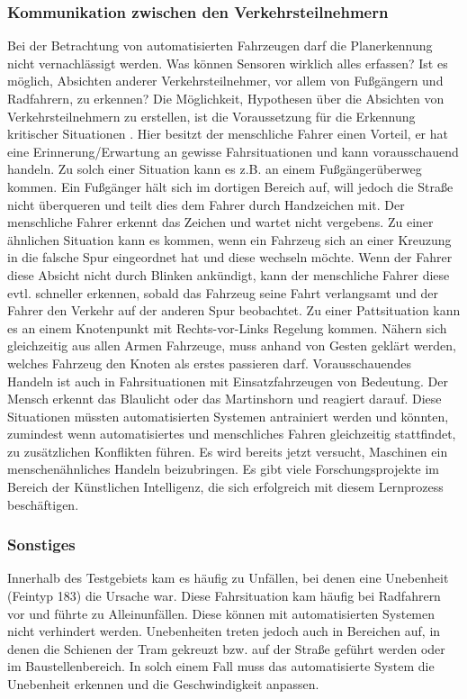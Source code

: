 \subsubsection{Kommunikation zwischen den Verkehrsteilnehmern}
Bei der Betrachtung von automatisierten Fahrzeugen darf die Planerkennung nicht vernachlässigt werden. Was können Sensoren wirklich alles erfassen? Ist es möglich, Absichten anderer Verkehrsteilnehmer, vor allem von Fußgängern und Radfahrern, zu erkennen? Die Möglichkeit, Hypothesen über die Absichten von Verkehrsteilnehmern zu erstellen, ist die Voraussetzung für die Erkennung kritischer Situationen \parencite[S. 30]{MockHecker.1994}. Hier besitzt der menschliche Fahrer einen Vorteil, er hat eine Erinnerung/Erwartung an gewisse Fahrsituationen und kann vorausschauend handeln. Zu solch einer Situation kann es z.B. an einem Fußgängerüberweg kommen. Ein Fußgänger hält sich im dortigen Bereich auf, will jedoch die Straße nicht überqueren und teilt dies dem Fahrer durch Handzeichen mit. Der menschliche Fahrer erkennt das Zeichen und wartet nicht vergebens. Zu einer ähnlichen Situation kann es kommen, wenn ein Fahrzeug sich an einer Kreuzung in die falsche Spur eingeordnet hat und diese wechseln möchte. Wenn der Fahrer diese Absicht nicht durch Blinken ankündigt, kann der menschliche Fahrer diese evtl. schneller erkennen, sobald das Fahrzeug seine Fahrt verlangsamt und der Fahrer den Verkehr auf der anderen Spur beobachtet. Zu einer Pattsituation kann es an einem Knotenpunkt mit Rechts-vor-Links Regelung kommen. Nähern sich gleichzeitig aus allen Armen Fahrzeuge, muss anhand von Gesten geklärt werden, welches Fahrzeug den Knoten als erstes passieren darf. Vorausschauendes Handeln ist auch in Fahrsituationen mit Einsatzfahrzeugen von Bedeutung. Der Mensch erkennt das Blaulicht oder das Martinshorn und reagiert darauf. Diese Situationen müssten automatisierten Systemen antrainiert werden und könnten, zumindest wenn automatisiertes und menschliches Fahren gleichzeitig stattfindet, zu zusätzlichen Konflikten führen. Es wird bereits jetzt versucht, Maschinen ein menschenähnliches Handeln beizubringen. Es gibt viele Forschungsprojekte im Bereich der Künstlichen Intelligenz, die sich erfolgreich mit diesem Lernprozess beschäftigen.

\subsubsection{Sonstiges}
Innerhalb des Testgebiets kam es häufig zu Unfällen, bei denen eine Unebenheit (Feintyp 183) die Ursache war. Diese Fahrsituation kam häufig bei Radfahrern vor und führte zu Alleinunfällen. Diese können mit automatisierten Systemen nicht verhindert werden. Unebenheiten treten jedoch auch in Bereichen auf, in denen die Schienen der Tram gekreuzt bzw. auf der Straße geführt werden oder im Baustellenbereich. In solch einem Fall muss das automatisierte System die Unebenheit erkennen und die Geschwindigkeit anpassen.

